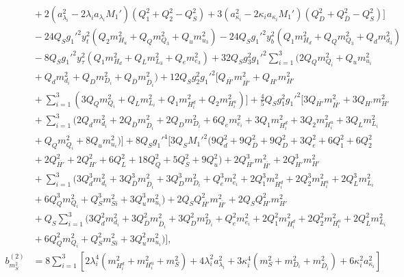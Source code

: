 \documentclass[preprint,amsmath,amssymb,aps,superscriptaddress,prd,showpacs,floatfix,nofootinbib]{revtex4-1}
\begin{document}
\begin{subequations}
\begin{align}
&{}+2\left ( a_{\lambda_i}^2-2\lambda_ia_{\lambda_i}M_1'\right )\left ( Q_1^2+Q_2^2-Q_S^2\right )+3\left ( a_{\kappa_i}^2-2\kappa_ia_{\kappa_i}M_1'\right )\left ( Q_D^2+Q_{\overline{D}}^2-Q_S^2\right )\bigg ]\nonumber\\
&{}-24Q_Sg_1'^2y_t^2\left ( Q_2m_{H_u}^2+Q_Qm_{Q_3}^2+Q_um_{u_3}^2\right )-24Q_Sg_1'^2y_b^2\left ( Q_1m_{H_d}^2+Q_Qm_{Q_3}^2+Q_dm_{d_3}^2\right )\nonumber\\
&{}-8Q_Sg_1'^2y_\tau^2\left ( Q_1m_{H_d}^2+Q_Lm_{L_3}^2+Q_em_{e_3}^2\right )+32Q_Sg_3^2g_1'^2\sum_{i=1}^3\big ( 2Q_Qm_{Q_i}^2+Q_um_{u_i}^2\nonumber\\
&{}+Q_dm_{d_i}^2+Q_Dm_{D_i}^2+Q_{\overline{D}}m_{\overline{D}_i}^2\big )+12Q_Sg_2^2g_1'^2\bigg [ Q_{\overline{H'}}m_{\overline{H'}}^2+Q_{H'}m_{H'}^2\nonumber\\
&{}+\sum_{i=1}^3\left ( 3Q_Qm_{Q_i}^2+Q_Lm_{L_i}^2+Q_1m_{H_i^d}^2+Q_2m_{H_i^u}^2\right )\bigg ]+\frac{4}{5}Q_Sg_1^2g_1'^2\bigg [ 3Q_{\overline{H'}}m_{\overline{H'}}^2+3Q_{H'}m_{H'}^2\nonumber\\
&{}+\sum_{i=1}^3\big ( 2Q_dm_{d_i}^2+2Q_{\overline{D}}m_{\overline{D}_i}^2+2Q_Dm_{D_i}^2+6Q_em_{e_i}^2+3Q_1m_{H_i^d}^2+3Q_2m_{H_i^u}^2+3Q_Lm_{L_i}^2\nonumber\\
&{}+Q_Qm_{Q_i}^2+8Q_um_{u_i}^2\big )\bigg ]+8Q_Sg_1'^4\bigg [ 3Q_SM_1'^2\big ( 9Q_d^2+9Q_{\overline{D}}^2+9Q_D^2+3Q_e^2+6Q_1^2+6Q_2^2\nonumber\\
&{}+2Q_{\overline{H'}}^2+2Q_{H'}^2+6Q_L^2+18Q_Q^2+5Q_S^2+9Q_u^2\big )+2Q_{\overline{H'}}^3m_{\overline{H'}}^2+2Q_{H'}^3m_{H'}^2\nonumber\\
&{}+\sum_{i=1}^3\big ( 3Q_d^3m_{d_i}^2+3Q_{\overline{D}}^3m_{\overline{D}_i}^2+3Q_D^3m_{D_i}^2+Q_e^3m_{e_i}^2+2Q_1^3m_{H_i^d}^2+2Q_2^3m_{H_i^u}^2+2Q_L^3m_{L_i}^2\nonumber\\
&{}+6Q_Q^3m_{Q_i}^2+Q_S^3m_{Si}^2+3Q_u^3m_{u_i}^2\big )+2Q_SQ_{\overline{H'}}^2m_{\overline{H'}}^2+2Q_SQ_{H'}^2m_{H'}^2\nonumber\\
&{}+Q_S\sum_{i=1}^3\big ( 3Q_d^2m_{d_i}^2+3Q_{\overline{D}}^2m_{\overline{D}_i}^2+3Q_D^2m_{D_i}^2+Q_e^2m_{e_i}^2+2Q_1^2m_{H_i^d}^2+2Q_2^2m_{H_i^u}^2+2Q_L^2m_{L_i}^2\nonumber\\
&{}+6Q_Q^2m_{Q_i}^2+Q_S^2m_{Si}^2+3Q_u^2m_{u_i}^2\big )\bigg ],\label{eq:USSMms2BetaTwoLoop}\\
b_{m_S^2}^{(2)}&=8\sum_{i=1}^3\left [ 2\lambda_i^4\left ( m_{H_i^d}^2+m_{H_i^u}^2+m_S^2\right )+4\lambda_i^2a_{\lambda_i}^2 +3\kappa_i^4\left ( m_S^2+m_{D_i}^2+m_{\overline{D}_i}^2\right )+6\kappa_i^2a_{\kappa_i}^2\right ]\nonumber\\

\end{align}
\end{subequations}
\end{document}
